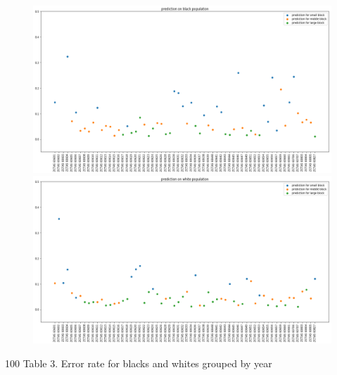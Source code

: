 \documentclass{article}
\begin{document}
\begin{figure}[!h] 
\centering 
\includegraphics[width=1.2\textwidth]{graph3.png} 
\includegraphics[width=1.2\textwidth]{graph4.png} 
\end{figure}
\clearpage
\centerline{{\color{white} 100} Table 3. Error rate for blacks and whites grouped by year}
\end{document}
